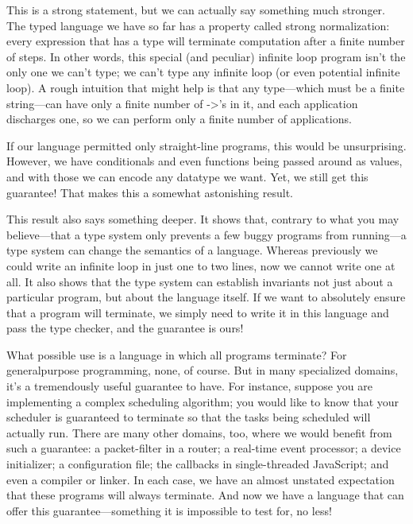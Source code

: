 This is a strong statement, but we can actually say something much stronger. The
typed language we have so far has a property called strong normalization: every
expression that has a type will terminate computation after a finite number of
steps. In other words, this special (and peculiar) infinite loop program isn’t
the only one we can’t type; we can’t type any infinite loop (or even potential
infinite loop). A rough intuition that might help is that any type—which must be
a finite string—can have only a finite number of ->’s in it, and each
application discharges one, so we can perform only a finite number of
applications.

If our language permitted only straight-line programs, this would be
unsurprising. However, we have conditionals and even functions being passed
around as values, and with those we can encode any datatype we want. Yet, we
still get this guarantee! That makes this a somewhat astonishing result.


This result also says something deeper. It shows that, contrary to what you may
believe—that a type system only prevents a few buggy programs from running—a
type system can change the semantics of a language. Whereas previously we could
write an infinite loop in just one to two lines, now we cannot write one at all.
It also shows that the type system can establish invariants not just about a
particular program, but about the language itself. If we want to absolutely
ensure that a program will terminate, we simply need to write it in this
language and pass the type checker, and the guarantee is ours!

What possible use is a language in which all programs terminate? For
generalpurpose programming, none, of course. But in many specialized domains,
it’s a tremendously useful guarantee to have. For instance, suppose you are
implementing a complex scheduling algorithm; you would like to know that your
scheduler is guaranteed to terminate so that the tasks being scheduled will
actually run. There are many other domains, too, where we would benefit from
such a guarantee: a packet-filter in a router; a real-time event processor; a
device initializer; a configuration file; the callbacks in single-threaded
JavaScript; and even a compiler or linker. In each case, we have an almost
unstated expectation that these programs will always terminate. And now we have
a language that can offer this guarantee—something it is impossible to test for,
no less!

